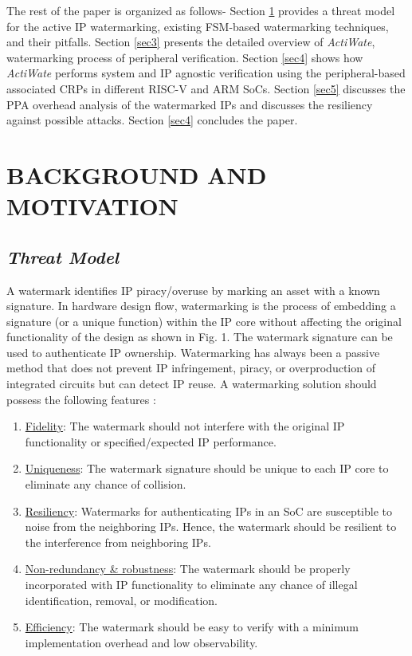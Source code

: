 \documentclass[onecolumn]{IEEEtran}
\begin{document}
The rest of the paper is organized as follows- Section \ref{sec2} provides
a threat model for the active IP watermarking, existing FSM-based
watermarking techniques, and their pitfalls. Section \ref{sec3} presents the
detailed overview of \textit{ActiWate}, watermarking process of peripheral
verification. Section \ref{sec4} shows how \textit{ActiWate} performs system and
IP agnostic verification using the peripheral-based associated CRPs
in different RISC-V and ARM SoCs. Section \ref{sec5} discusses the PPA
overhead analysis of the watermarked IPs and discusses the resiliency
against possible attacks. Section \ref{sec4} concludes the paper.


\section{BACKGROUND AND MOTIVATION}
\label{sec2}
\subsection{\textit{Threat Model}}
\label{sec2a}
A watermark identifies IP piracy/overuse by marking an asset with
a known signature. In hardware design flow, watermarking is the
process of embedding a signature (or a unique function) within the
IP core without affecting the original functionality of the design as
shown in Fig. 1. The watermark signature can be used to authenticate
IP ownership. Watermarking has always been a passive method
that does not prevent IP infringement, piracy, or overproduction of
integrated circuits but can detect IP reuse. A watermarking solution
should possess the following features \cite{Anandakumar2022}:

\begin{enumerate}[label=(R\arabic*)]
	\item \underline{Fidelity}: The watermark should not interfere with the original IP functionality or specified/expected IP performance.
	
	\item \underline{Uniqueness}: The watermark signature should be unique to each IP core to eliminate any chance of collision.
	
	\item \underline{Resiliency}: Watermarks for authenticating IPs in an SoC are susceptible to noise from the neighboring IPs. Hence, the watermark should be resilient to the interference from neighboring IPs.
	
	\item \underline{Non-redundancy \& robustness}: The watermark should be properly incorporated with IP functionality to eliminate any chance of illegal identification, removal, or modification.
	
	\item \underline{Efficiency}: The watermark should be easy to verify with a minimum implementation overhead and low observability.\\
\end{enumerate}
  
\end{document}
